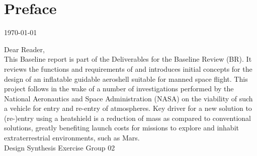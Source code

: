 \section*{Preface}\label{cha:preface}

\begin{flushright}
	\today
\end{flushright}

Dear Reader,	
\\ [1cm]
This Baseline report is part of the Deliverables for the Baseline Review (BR). It reviews the functions and requirements of and introduces initial concepts for the design of an inflatable guidable aeroshell suitable for manned space flight. This project follows in the wake of a number of investigations performed by the National Aeronautics and Space Administration (NASA) on the viability of such a vehicle for entry and re-entry of atmospheres. Key driver for a new solution to (re-)entry using a heatshield is a reduction of mass as compared to conventional solutions, greatly benefiting launch costs for missions to explore and inhabit extraterrestrial environments, such as Mars. 
\\ [1.5cm]
Design Synthesis Exercise Group 02